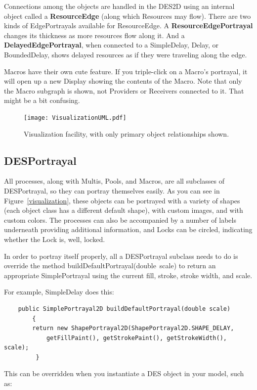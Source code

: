 \documentclass[twoside,10pt]{article}
\newcommand\method[1]{\hbox{\textsf{#1}}}
\begin{document}
Connections among the objects are handled in the DES2D using an internal object called a {\bf ResourceEdge} (along which Resources may flow).  There are two kinds of EdgePortrayals available for ResourceEdge.  A {\bf ResourceEdgePortrayal} changes its thickness as more resources flow along it.  And a {\bf DelayedEdgePortrayal}, when connected to a SimpleDelay, Delay, or BoundedDelay, shows delayed resources as if they were traveling along the edge.

Macros have their own cute feature.  If you triple-click on a Macro's portrayal, it will open up a new Display showing the contents of the Macro.  Note that only the Macro subgraph is shown, not Providers or Receivers connected to it.  That might be a bit confusing.


\begin{figure}[t]
\centering\texttt{[image: VisualizationUML.pdf]}
\caption{Visualization facility, with only primary object relationships shown.}
\end{figure}


\subsection{DESPortrayal}

All processes, along with Multis, Pools, and Macros, are all subclasses of DESPortrayal, so they can portray themselves easily.  As you can see in Figure~\ref{visualization}, these objects can be portrayed with a variety of shapes (each object class has a different default shape), with custom images, and with custom colors.  The processes can also be accompanied by a number of labels underneath providing additional information, and Locks can be circled, indicating whether the Lock is, well, locked.

In order to portray itself properly, all a DESPortrayal subclass needs to do is override the method \method{buildDefaultPortrayal(double scale)} to return an appropriate SimplePortrayal using the current fill, stroke, stroke width, and scale.  

For example, SimpleDelay does this:

\begin{verbatim}
    public SimplePortrayal2D buildDefaultPortrayal(double scale)
        {
        return new ShapePortrayal2D(ShapePortrayal2D.SHAPE_DELAY, 
            getFillPaint(), getStrokePaint(), getStrokeWidth(), scale);
         }
\end{verbatim}

This can be overridden when you instantiate a DES object in your model, such as:
\end{document}
